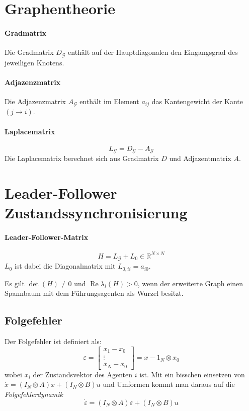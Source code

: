 \section{Graphentheorie}
\paragraph{Gradmatrix}
Die Gradmatrix $D_\mathcal{G}$ enthält auf der Hauptdiagonalen den Eingangsgrad des jeweiligen Knotens.

\paragraph{Adjazenzmatrix}
Die Adjazenzmatrix $A_\mathcal{G}$ enthält im Element $a_{ij}$
das Kantengewicht der Kante $(j \rightarrow i)$.

\paragraph{Laplacematrix}
\begin{equation}
    \tag{Laplacematrix}
    L_\mathcal{G} = D_\mathcal{G} - A_\mathcal{G}
    \label{eqn:laplace_matrix}
\end{equation}
Die Laplacematrix berechnet sich aus Gradmatrix $D$ und
Adjazentmatrix $A$.

\section{Leader-Follower Zustandssynchronisierung}
\paragraph{Leader-Follower-Matrix}
\begin{equation}
    \tag{Leader-Follower-Matrix}
    H = L_\mathcal{G} + L_0 \in \mathbb{R}^{N\times N}
    \label{eqn:lf_matrix}
\end{equation}
$L_0$ ist dabei die Diagonalmatrix mit $L_{0,ii}=a_{i0}$.

Es gilt $\det(H) \neq 0$ und $\operatorname{Re}\lambda_i(H) > 0$,
wenn der erweiterte Graph einen Spannbaum mit dem Führungsagenten als
Wurzel besitzt.

\subsection{Folgefehler}
Der Folgefehler ist definiert als:
\begin{equation}
    \varepsilon = \begin{bmatrix}
        x_1-x_0 \\
        \vdots \\
        x_N-x_0
    \end{bmatrix}
    = x-1_N \otimes x_0
\end{equation}
wobei $x_i$ der Zustandsvektor des Agenten $i$ ist.
Mit ein bisschen einsetzen von $\dot{x} = (I_N \otimes A)x + (I_N \otimes B)u$
und Umformen kommt man daraus auf die \emph{Folgefehlerdynamik}
\begin{equation}
    \dot{\varepsilon} = (I_N \otimes A)\varepsilon + (I_N \otimes B)u
\end{equation}

